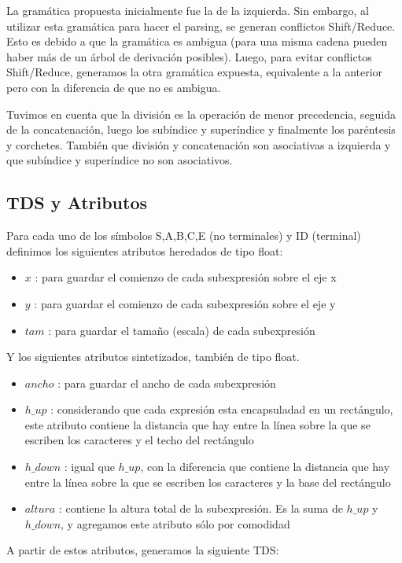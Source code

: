 \documentclass[a4paper, 10pt, twoside]{article}
\begin{document}
La gramática propuesta inicialmente fue la de la izquierda. Sin embargo, al utilizar esta gramática para hacer el parsing, se generan conflictos Shift/Reduce. Esto es debido a que la gramática es ambigua (para una misma cadena pueden haber más de un árbol de derivación posibles). Luego, para evitar conflictos Shift/Reduce, generamos la otra gramática expuesta, equivalente a la anterior pero con la diferencia de que no es ambigua.

Tuvimos en cuenta que la división es la operación de menor precedencia, seguida de la concatenación, luego los subíndice y superíndice y finalmente los paréntesis y corchetes. También que división y concatenación son asociativas a izquierda y que subíndice y superíndice no son asociativos.

\subsection{TDS y Atributos}
Para cada uno de los símbolos S,A,B,C,E (no terminales) y ID (terminal) definimos los siguientes atributos heredados de tipo float:
\begin{itemize}
  \item $x$ : para guardar el comienzo de cada subexpresión sobre el eje x
  \item $y$ : para guardar el comienzo de cada subexpresión sobre el eje y
  \item $tam$ : para guardar el tamaño (escala) de cada subexpresión
\end{itemize}

Y los siguientes atributos sintetizados, también de tipo float.
\begin{itemize}
  \item $ancho$ : para guardar el ancho de cada subexpresión
  \item $h\_up$ : considerando que cada expresión esta encapsuladad en un rectángulo, este atributo contiene la distancia que hay entre la línea sobre la que se escriben los caracteres y el techo del rectángulo
  \item $h\_down$ : igual que $h\_up$, con la diferencia que contiene la distancia que hay entre la línea sobre la que se escriben los caracteres y la base del rectángulo
  \item $altura$ : contiene la altura total de la subexpresión. Es la suma de $h\_up$ y $h\_down$, y agregamos este atributo sólo por comodidad
\end{itemize}

A partir de estos atributos, generamos la siguiente TDS:
\end{document}

